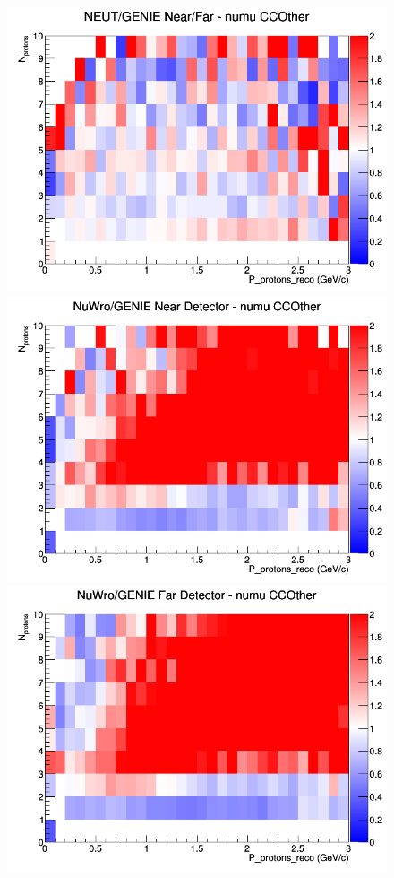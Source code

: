 \begin{figure}[h]
\endminipage
{}
\includegraphics[width=\linewidth]{eff_N_P/LAr/protons/ratios/CCOther_NEUT_GENIE_numu_NF_N_P.png}
\endminipage
\newline
{}
\includegraphics[width=\linewidth]{eff_N_P/LAr/protons/ratios/CCOther_NuWro_GENIE_numu_near_N_P.png}
\endminipage
{}
\includegraphics[width=\linewidth]{eff_N_P/LAr/protons/ratios/CCOther_NuWro_GENIE_numu_far_N_P.png}

\end{figure}
